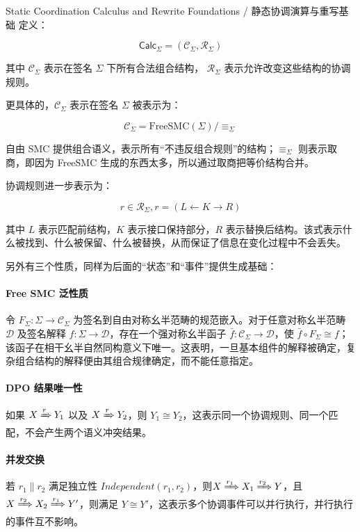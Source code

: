 \begin{MWCallout}[MWCyan]{Static Coordination Calculus and Rewrite Foundations / 静态协调演算与重写基础}
  定义：

  \begin{equation}
    \mathsf{Calc}_{\Sigma}=(\mathcal C_{\Sigma},\mathcal R_{\Sigma})
    \label{eq:definition-of-calc}
  \end{equation}

  其中 $\mathcal C_{\Sigma}$ 表示在签名 $\Sigma$ 下所有合法组合结构， $\mathcal R_{\Sigma}$ 表示允许改变这些结构的协调规则。

  更具体的，$\mathcal C_{\Sigma}$ 表示在签名 $\Sigma$ 被表示为：

  \begin{equation}
    \mathcal C_{\Sigma}=\text{FreeSMC}(\Sigma)/\equiv_\Sigma
    \label{eq:definition-of-static-composition-category}
  \end{equation}

  自由 SMC 提供组合语义，表示所有“不违反组合规则”的结构；$\equiv_\Sigma$ 则表示取商，即因为 FreeSMC 生成的东西太多，所以通过取商把等价结构合并。

  协调规则进一步表示为：

  \begin{equation}
  \boxed{r\in\mathcal R_\Sigma, r=(L \leftarrow K \rightarrow R)
  }
  \label{eq:coordinate-rules}
  \end{equation}

  其中 $L$ 表示匹配前结构，$K$ 表示接口保持部分，$R$ 表示替换后结构。该式表示什么被找到、什么被保留、什么被替换，从而保证了信息在变化过程中不会丢失。

  另外有三个性质，同样为后面的“状态”和“事件”提供生成基础：

  \paragraph{Free SMC 泛性质} 令 $F_{\Sigma}:\Sigma\rightarrow\mathcal C_{\Sigma}$ 为签名到自由对称幺半范畴的规范嵌入。对于任意对称幺半范畴 $\mathcal D$ 及签名解释 $f:\Sigma\rightarrow\mathcal D$，存在一个强对称幺半函子 $\bar f:\mathcal C_{\Sigma}\rightarrow\mathcal D$，使 $\bar f\circ F_{\Sigma}\cong f$；该函子在相干幺半自然同构意义下唯一。这表明，一旦基本组件的解释被确定，复杂组合结构的解释便由其组合规律确定，而不能任意指定。

  \paragraph{DPO 结果唯一性} 如果 $X \xRightarrow r Y_1$ 以及 $X \xRightarrow r Y_2$，则 $Y_1\cong Y_2$，这表示同一个协调规则、同一个匹配，不会产生两个语义冲突结果。

  \paragraph{并发交换} 若 $r_1\parallel r_2$ 满足独立性 $Independent(r_1,r_2)$，则$ X \xRightarrow{r_1} X_1 \xRightarrow{r_2} Y$，且  $X \xRightarrow{r_2} X_2 \xRightarrow{r_1} Y'$，则满足 $Y\cong Y'$，这表示多个协调事件可以并行执行，并行执行的事件互不影响。
\end{MWCallout}


